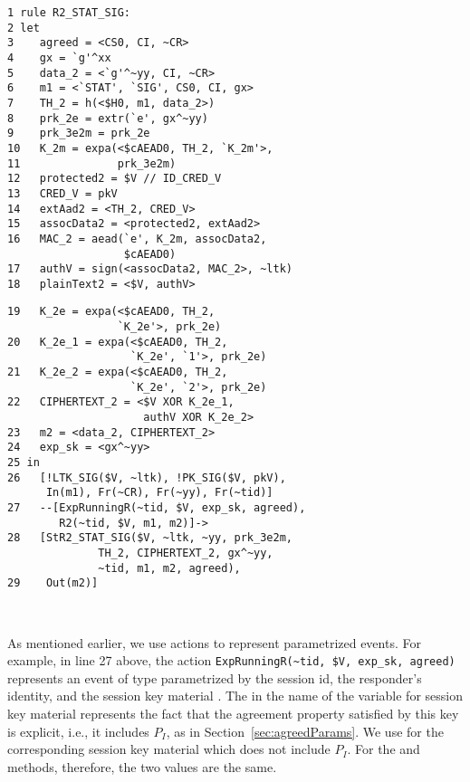 {
\bgroup
\parindent 0pt
\begin{minipage}{0.49\textwidth}
\bgroup
\parindent 0pt
\begin{scriptsize}
\begin{verbatim}
1 rule R2_STAT_SIG:
2 let
3    agreed = <CS0, CI, ~CR>
4    gx = `g'^xx
5    data_2 = <`g'^~yy, CI, ~CR>
6    m1 = <`STAT', `SIG', CS0, CI, gx>
7    TH_2 = h(<$H0, m1, data_2>)
8    prk_2e = extr(`e', gx^~yy)
9    prk_3e2m = prk_2e
10   K_2m = expa(<$cAEAD0, TH_2, `K_2m'>,
11               prk_3e2m)
12   protected2 = $V // ID_CRED_V
13   CRED_V = pkV
14   extAad2 = <TH_2, CRED_V>
15   assocData2 = <protected2, extAad2>
16   MAC_2 = aead(`e', K_2m, assocData2,
                  $cAEAD0)
17   authV = sign(<assocData2, MAC_2>, ~ltk)
18   plainText2 = <$V, authV>
\end{verbatim}
\end{scriptsize}
\egroup
\end{minipage}
\begin{minipage}{0.02\textwidth}
\end{minipage}
\begin{minipage}{0.48\textwidth}
\bgroup
\parindent 0pt
\begin{scriptsize}
\begin{verbatim}
19   K_2e = expa(<$cAEAD0, TH_2,
                 `K_2e'>, prk_2e)
20   K_2e_1 = expa(<$cAEAD0, TH_2,
                   `K_2e', `1'>, prk_2e)
21   K_2e_2 = expa(<$cAEAD0, TH_2,
                   `K_2e', `2'>, prk_2e)
22   CIPHERTEXT_2 = <$V XOR K_2e_1,
                     authV XOR K_2e_2>
23   m2 = <data_2, CIPHERTEXT_2>
24   exp_sk = <gx^~yy>
25 in
26   [!LTK_SIG($V, ~ltk), !PK_SIG($V, pkV),
      In(m1), Fr(~CR), Fr(~yy), Fr(~tid)]
27   --[ExpRunningR(~tid, $V, exp_sk, agreed),
        R2(~tid, $V, m1, m2)]->
28   [StR2_STAT_SIG($V, ~ltk, ~yy, prk_3e2m,
              TH_2, CIPHERTEXT_2, gx^~yy,
              ~tid, m1, m2, agreed),
29    Out(m2)]
\end{verbatim}
\end{scriptsize}
\egroup
\end{minipage}
\\
\egroup
%
}
\vspace{5mm}

As mentioned earlier, we use actions to represent parametrized events.
%
For example, in line 27 above, the action
\verb|ExpRunningR(~tid, $V, exp_sk, agreed)| represents an event of type
\mRStart{} parametrized by the session id, the responder's identity, and the
session key material .
%
The  in the name of the variable for session key material represents
the fact that the agreement property satisfied by this key is explicit, i.e.,
it includes $P_{I}$, as in Section~\ref{sec:agreedParams}.
%
We use  for the corresponding session key material which does 
not
include $P_{I}$.
%
For the \mSigSig{} and \mSigStat{} methods, therefore, the two values are the 
same.
%

